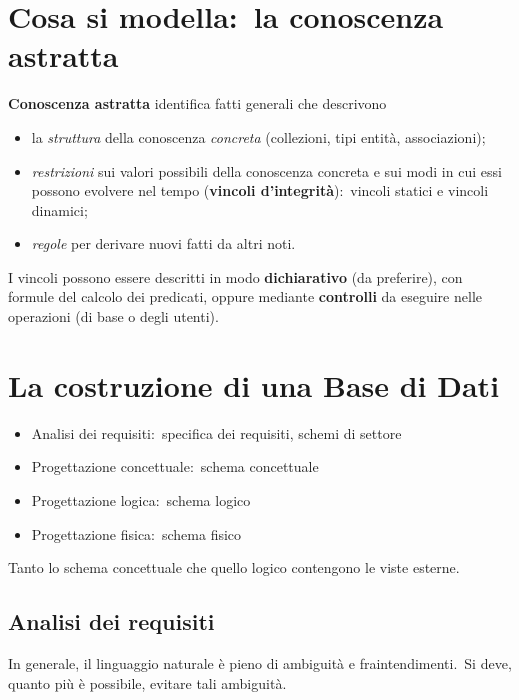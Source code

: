 \section{Cosa si modella:\ la conoscenza astratta}

\textbf{Conoscenza astratta} identifica fatti generali che descrivono
\begin{itemize}
	\item la \textit{struttura} della conoscenza \textit{concreta} (collezioni, tipi entità, associazioni);
	\item \textit{restrizioni} sui valori possibili della conoscenza concreta e sui modi in cui essi possono evolvere nel tempo (\textbf{vincoli d'integrità}):\ vincoli statici e vincoli dinamici;
	\item \textit{regole} per derivare nuovi fatti da altri noti.
\end{itemize}
I vincoli possono essere descritti in modo \textbf{dichiarativo} (da preferire), con formule del calcolo dei predicati, oppure mediante \textbf{controlli} da eseguire nelle operazioni (di base o degli utenti).

\section{La costruzione di una Base di Dati}

\begin{itemize}
	\item Analisi dei requisiti:\ specifica dei requisiti, schemi di settore
	\item Progettazione concettuale:\ schema concettuale
	\item Progettazione logica:\ schema logico
	\item Progettazione fisica:\ schema fisico
\end{itemize}
Tanto lo schema concettuale che quello logico contengono le viste esterne.

\subsection{Analisi dei requisiti}

In generale, il linguaggio naturale è pieno di ambiguità e fraintendimenti.\
Si deve, quanto più è possibile, evitare tali ambiguità.

